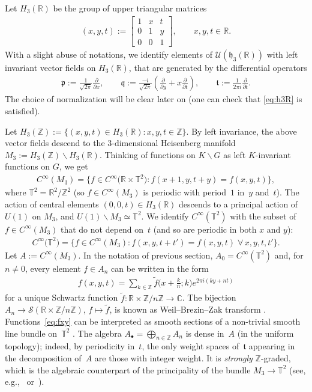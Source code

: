 \documentclass[pdftex]{sigma}
\numberwithin{equation}{section}
\theoremstyle{definition}
\newcommand{\U}{\mathcal{U}}
\newcommand{\R}{\mathbb{R}}
\newcommand{\C}{\mathbb{C}}
\newcommand{\Z}{\mathbb{Z}}
\newcommand{\T}{\mathbb{T}}
\newcommand{\mc}{\mathcal}
\newcommand{\mf}{\mathfrak}
\newcommand{\ga}{\mf{p}}
\newcommand{\gb}{\mf{q}}
\newcommand{\gc}{\mf{t}}
\begin{document}
Let $H_3(\R)$ be the group of upper triangular matrices
\begin{gather*}
(x,y,t):=\left[ \begin{matrix}
1 & x & t \\ 0 & 1 & y \\ 0 & 0 & 1
\end{matrix} \right] ,\qquad x,y,t\in\R.
\end{gather*}
With a slight abuse of notations, we identify elements of $\U(\mf{h}_3(\R))$ with left invariant vector f\/ields on $H_3(\R)$, that are generated by the dif\/ferential operators
\begin{gather*}%
\ga:=\frac{1}{\sqrt{2\pi}}\frac{\partial}{\partial x}
,\qquad
\gb:=\frac{-i}{\sqrt{2\pi}}\left(\frac{\partial}{\partial y}+x\frac{\partial}{\partial t}\right)
,\qquad
\gc:=\frac{1}{2\pi i}\frac{\partial}{\partial t}
.
\end{gather*}
The choice of normalization will be clear later on (one can check that \eqref{eq:h3R} is satisf\/ied).

Let $H_3(\Z):=\{(x,y,t)\in H_3(\R)\colon x,y,t\in\Z\}$.
By left invariance, the above vector f\/ields descend to the
$3$-dimensional Heisenberg manifold $M_3:=H_3(\Z)\backslash H_3(\R)$.
Thinking of functions on $K\backslash G$ as left $K$-invariant functions on $G$, we get
\begin{gather*}
C^\infty(M_3)=\big\{f\in C^\infty\big(\R\times\T^2\big)\colon f(x+1,y,t+y)=f(x,y,t)\big\} ,
\end{gather*}
where $\T^2=\R^2/\Z^2$ (so $f\in C^\infty(M_3)$ is periodic with period~$1$ in~$y$ and~$t$).
The action of central elements $(0,0,t)\in H_3(\R)$ descends to a principal action of $U(1)$ on $M_3$, and $U(1)\backslash M_3\simeq\T^2$. We identify
$C^\infty(\T^2)$ with the subset of $f\in C^\infty(M_3)$ that do not depend on~$t$ (and so are periodic in both $x$ and $y$):
\begin{gather*}
C^\infty\big(\T^2\big)=\big\{f\in C^\infty(M_3)\colon f(x,y,t+t')=f(x,y,t)\; \forall\,x,y,t,t'\big\} .
\end{gather*}
Let $A:=C^\infty(M_3)$. In the notation of previous section, $A_0=
C^\infty(\T^2)$ and, for $n\neq 0$, every element $f\in A_n$ can be written in the form
\begin{gather}\label{eq:fxy}
f(x,y,t)=\sum_{k\in\Z}\widetilde{f}\big(x+\tfrac{k}{n};k\big)e^{2\pi i(ky+nt)}
\end{gather}
for a unique Schwartz function $\widetilde{f}\colon \R\times\Z/n\Z\to\C$.
The bijection $A_n\to\mc{S}(\R\times\Z/n\Z)$, $f\mapsto\widetilde{f}$, is known as Weil--Brezin--Zak transform \cite[Section~1.10]{Fol89}.
Functions~\eqref{eq:fxy} can be interpreted as smooth sections of a non-trivial smooth line bundle on~$\T^2$ \cite{DFF13}.
The algebra $A_\bullet=\bigoplus_{n\in\Z}A_n$ is dense in~$A$ (in the uniform topology); indeed, by periodicity in~$t$, the only weight spaces of~$\gc$ appearing in the decomposition of~$A$ are those with integer weight.
It is \emph{strongly} $\Z$-graded, which is the algebraic counterpart of the principality of the bundle $M_3\to\T^2$ (see, e.g.,~\cite{ADL15} or~\cite{D15}).
\end{document}
